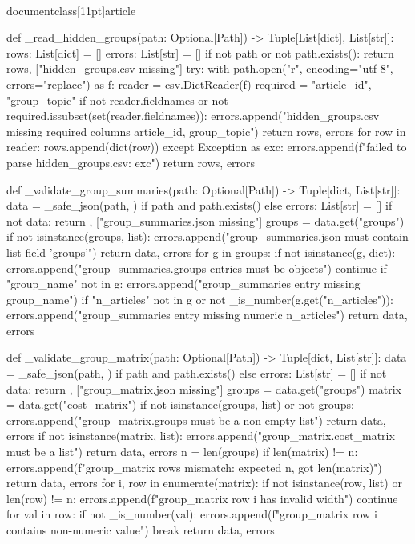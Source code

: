 \\documentclass[11pt]{article}
\begin{document}
\begin{CodeBlock}
def _read_hidden_groups(path: Optional[Path]) -> Tuple[List[dict], List[str]]:
    rows: List[dict] = []
    errors: List[str] = []
    if not path or not path.exists():
        return rows, ["hidden_groups.csv missing"]
    try:
        with path.open("r", encoding="utf-8", errors="replace") as f:
            reader = csv.DictReader(f)
            required = {"article_id", "group_topic"}
            if not reader.fieldnames or not required.issubset(set(reader.fieldnames)):
                errors.append("hidden_groups.csv missing required columns article_id, group_topic")
                return rows, errors
            for row in reader:
                rows.append(dict(row))
    except Exception as exc:
        errors.append(f"failed to parse hidden_groups.csv: {exc}")
    return rows, errors


def _validate_group_summaries(path: Optional[Path]) -> Tuple[dict, List[str]]:
    data = _safe_json(path, {}) if path and path.exists() else {}
    errors: List[str] = []
    if not data:
        return {}, ["group_summaries.json missing"]
    groups = data.get("groups")
    if not isinstance(groups, list):
        errors.append("group_summaries.json must contain list field 'groups'")
        return data, errors
    for g in groups:
        if not isinstance(g, dict):
            errors.append("group_summaries.groups entries must be objects")
            continue
        if "group_name" not in g:
            errors.append("group_summaries entry missing group_name")
        if "n_articles" not in g or not _is_number(g.get("n_articles")):
            errors.append("group_summaries entry missing numeric n_articles")
    return data, errors


def _validate_group_matrix(path: Optional[Path]) -> Tuple[dict, List[str]]:
    data = _safe_json(path, {}) if path and path.exists() else {}
    errors: List[str] = []
    if not data:
        return {}, ["group_matrix.json missing"]
    groups = data.get("groups")
    matrix = data.get("cost_matrix")
    if not isinstance(groups, list) or not groups:
        errors.append("group_matrix.groups must be a non-empty list")
        return data, errors
    if not isinstance(matrix, list):
        errors.append("group_matrix.cost_matrix must be a list")
        return data, errors
    n = len(groups)
    if len(matrix) != n:
        errors.append(f"group_matrix rows mismatch: expected {n}, got {len(matrix)}")
        return data, errors
    for i, row in enumerate(matrix):
        if not isinstance(row, list) or len(row) != n:
            errors.append(f"group_matrix row {i} has invalid width")
            continue
        for val in row:
            if not _is_number(val):
                errors.append(f"group_matrix row {i} contains non-numeric value")
                break
    return data, errors



\end{CodeBlock}
\end{document}
